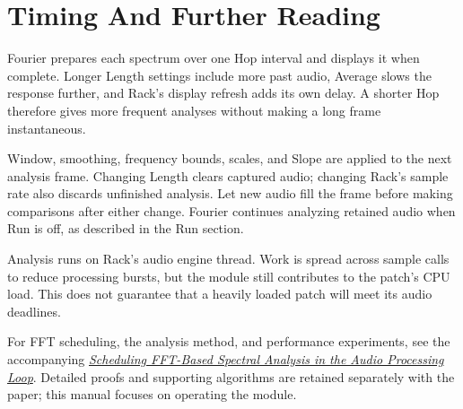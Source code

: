 \section{Timing And Further Reading}\label{sec:further-reading}

Fourier prepares each spectrum over one Hop interval and displays it when
complete. Longer Length settings include more past audio, Average slows the
response further, and Rack's display refresh adds its own delay. A shorter
Hop therefore gives more frequent analyses without making a long frame
instantaneous.

Window, smoothing, frequency bounds, scales, and Slope are applied to the
next analysis frame. Changing Length clears captured audio; changing Rack's sample rate
also discards unfinished analysis. Let new audio fill the frame before making
comparisons after either change. Fourier continues analyzing retained audio
when Run is off, as described in the Run section.

Analysis runs on Rack's audio engine thread. Work is spread across sample
calls to reduce processing bursts, but the module still contributes to the
patch's CPU load. This does not guarantee that a heavily loaded patch will
meet its audio deadlines.

For FFT scheduling, the analysis method, and performance experiments, see
the accompanying
\href{https://github.com/Arhythmetic-Units/Fourier/tree/main/docs/whitepaper}{\textit{Scheduling FFT-Based Spectral Analysis in the Audio Processing Loop}}.
Detailed proofs and supporting algorithms are retained separately with the
paper; this manual focuses on operating the module.
